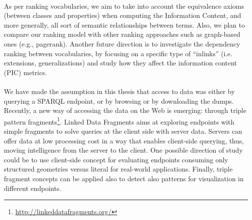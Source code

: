 \paragraph{}
 As per ranking vocabularies, we aim to take into account the equivalence axioms (between classes and properties) when computing the Information Content, and more generally, all sort of semantic relationships between terms. Also, we plan to compare our ranking model with other ranking approaches such as graph-based ones (e.g., pagerank). Another future direction is to investigate the dependency ranking between vocabularies, by focusing on a specific type of ``inlinks'' (i.e. extensions, generalizations) and study how they affect the information content (PIC) metrics.


\paragraph{}
We have made the assumption in this thesis that access to data was either by  querying a SPARQL endpoint, or by browsing or by downloading the dumps. Recently, a new way of accessing the data on the Web is emerging: through triple pattern fragments\footnote{\url{http://linkeddatafragments.org/}}. Linked Data Fragments \cite{verborgh2014ldf} aims at exploring endpoints with simple fragments to solve queries at the client side with server data.
Servers can offer data at low processing cost in a way that enables client-side querying, thus, moving intelligence from the server to the client. One possible direction of study could be to use client-side concept for evaluating endpoints consuming only structured geometries versus literal for real-world applications. Finally, triple fragment concepts can be applied also to detect also patterns for visualization in different endpoints.
 

 